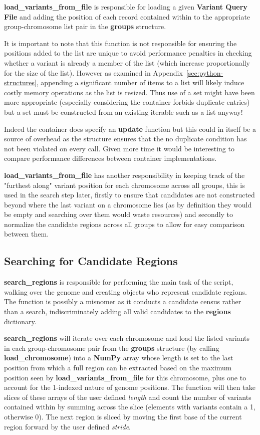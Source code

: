 \textbf{load\_variants\_from\_file} is responsible for loading a given
\textbf{Variant Query File} and adding the position of each record contained
within to the appropriate group-chromosome list pair in the \textbf{groups}
structure.

It is important to note that this function is not responsible for
ensuring the positions added to the list are unique to avoid performance
penalties in checking whether a variant is already a member of the list (which
increase proportionally for the size of the list).
However as examined in Appendix~\ref{sec:python-structures}, appending a
significant number of items to a list will likely induce costly memory
operations as the list is resized. Thus use of a set might have been more
appropriate (especially considering the container forbids duplicate entries)
but a set must be constructed from an existing iterable such as a list anyway!

Indeed the container does specify an \textbf{update} function but this could in
itself be a source of overhead as the structure ensures that the no duplicate
condition has not been violated on every call. Given more time it would be
interesting to compare performance differences between container implementations.

\textbf{load\_variants\_from\_file} has another responsibility in keeping track
of the "furthest along" variant position for each chromosome across all groups,
this is used in the search step later, firstly to ensure that candidates are not
constructed beyond where the last variant on a chromosome lies (as by definition
they would be empty and searching over them would waste resources) and secondly
to normalize the candidate regions across all groups to allow for easy
comparison between them.


\subsection{Searching for Candidate Regions}

\textbf{search\_regions} is responsible for performing the main task of the
script, walking over the genome and creating objects who represent candidate
regions. The function is possibly a misnomer as it conducts a candidate census
rather than a search, indiscriminately adding all valid candidates to the
\textbf{regions} dictionary.

\textbf{search\_regions} will iterate over each chromosome and load the listed
variants in each group-chromosome pair from the \textbf{groups} structure (by
calling \textbf{load\_chromosome}) into a
\textbf{NumPy} array whose length is set to the last position from which a full
region can be extracted based on the maximum position seen by
\textbf{load\_variants\_from\_file} for this chromosome, plus one to account for
the 1-indexed nature of genome positions. The function will then take slices of
these arrays of the user defined \textit{length} and count the number of
variants contained within by summing across the slice (elements with variants
contain a 1, otherwise 0). The next region is sliced by moving the first base of
the current region forward by the user defined \textit{stride}.

